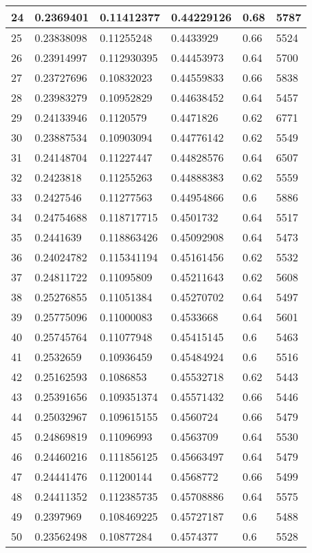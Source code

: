 \begin{longtable}{|l|l|l|l|l|l|}
24 & 0.2369401 & 0.11412377 & 0.44229126 & 0.68 & 5787 \\ \hline 
25 & 0.23838098 & 0.11255248 & 0.4433929 & 0.66 & 5524 \\ \hline 
26 & 0.23914997 & 0.112930395 & 0.44453973 & 0.64 & 5700 \\ \hline 
27 & 0.23727696 & 0.10832023 & 0.44559833 & 0.66 & 5838 \\ \hline 
28 & 0.23983279 & 0.10952829 & 0.44638452 & 0.64 & 5457 \\ \hline 
29 & 0.24133946 & 0.1120579 & 0.4471826 & 0.62 & 6771 \\ \hline 
30 & 0.23887534 & 0.10903094 & 0.44776142 & 0.62 & 5549 \\ \hline 
31 & 0.24148704 & 0.11227447 & 0.44828576 & 0.64 & 6507 \\ \hline 
32 & 0.2423818 & 0.11255263 & 0.44888383 & 0.62 & 5559 \\ \hline 
33 & 0.2427546 & 0.11277563 & 0.44954866 & 0.6 & 5886 \\ \hline 
34 & 0.24754688 & 0.118717715 & 0.4501732 & 0.64 & 5517 \\ \hline 
35 & 0.2441639 & 0.118863426 & 0.45092908 & 0.64 & 5473 \\ \hline 
36 & 0.24024782 & 0.115341194 & 0.45161456 & 0.62 & 5532 \\ \hline 
37 & 0.24811722 & 0.11095809 & 0.45211643 & 0.62 & 5608 \\ \hline 
38 & 0.25276855 & 0.11051384 & 0.45270702 & 0.64 & 5497 \\ \hline 
39 & 0.25775096 & 0.11000083 & 0.4533668 & 0.64 & 5601 \\ \hline 
40 & 0.25745764 & 0.11077948 & 0.45415145 & 0.6 & 5463 \\ \hline 
41 & 0.2532659 & 0.10936459 & 0.45484924 & 0.6 & 5516 \\ \hline 
42 & 0.25162593 & 0.1086853 & 0.45532718 & 0.62 & 5443 \\ \hline 
43 & 0.25391656 & 0.109351374 & 0.45571432 & 0.66 & 5446 \\ \hline 
44 & 0.25032967 & 0.109615155 & 0.4560724 & 0.66 & 5479 \\ \hline 
45 & 0.24869819 & 0.11096993 & 0.4563709 & 0.64 & 5530 \\ \hline 
46 & 0.24460216 & 0.111856125 & 0.45663497 & 0.64 & 5479 \\ \hline 
47 & 0.24441476 & 0.11200144 & 0.4568772 & 0.66 & 5499 \\ \hline 
48 & 0.24411352 & 0.112385735 & 0.45708886 & 0.64 & 5575 \\ \hline 
49 & 0.2397969 & 0.108469225 & 0.45727187 & 0.6 & 5488 \\ \hline 
50 & 0.23562498 & 0.10877284 & 0.4574377 & 0.6 & 5528 \\ \hline 
\end{longtable}